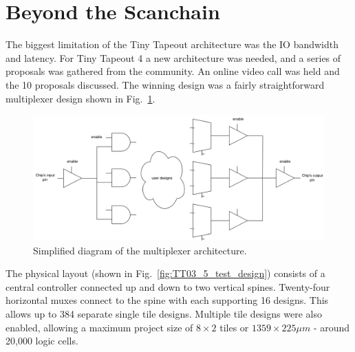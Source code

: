 \section{Beyond the Scanchain}
\label{sec:beyond_scanchain}
The biggest limitation of the Tiny Tapeout architecture was the IO bandwidth and latency.
For Tiny Tapeout 4 a new architecture was needed, and a series of proposals was gathered from the community.
An online video call was held and the 10 proposals discussed.
The winning design was a fairly straightforward multiplexer design shown in Fig.~\ref{fig:multiplexer_design}.

\begin{figure}[htp]
\centering
\includegraphics[width=\columnwidth]{./Figs/mux architecture.png}
\caption{Simplified diagram of the multiplexer architecture.}
\label{fig:multiplexer_design}
\end{figure}

The physical layout (shown in Fig.~\ref{fig:TT03_5_test_design}) consists of a central controller connected up and down to two vertical spines.
Twenty-four horizontal muxes connect to the spine with each supporting 16 designs.
This allows up to 384 separate single tile designs.
Multiple tile designs were also enabled, allowing a maximum project size of \(8 \times 2\) tiles or \(1359 \times 225 \mu m\) - around 20,000 logic cells.

